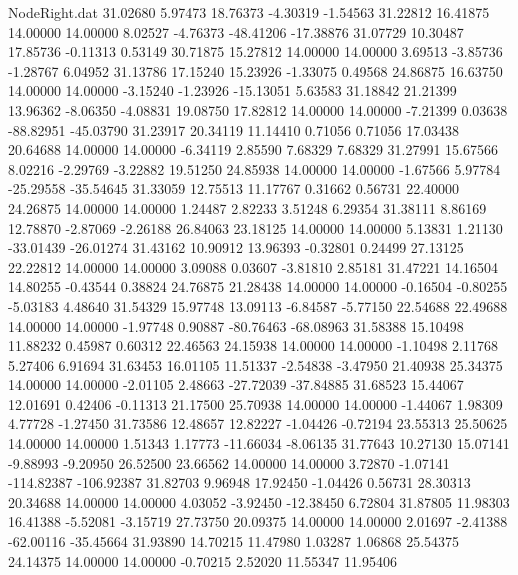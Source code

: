 \begin{filecontents}{NodeRight.dat}
  31.02680    5.97473   18.76373    -4.30319   -1.54563   31.22812   16.41875   14.00000   14.00000    8.02527   -4.76373  -48.41206  -17.38876
  31.07729   10.30487   17.85736    -0.11313    0.53149   30.71875   15.27812   14.00000   14.00000    3.69513   -3.85736   -1.28767    6.04952
  31.13786   17.15240   15.23926    -1.33075    0.49568   24.86875   16.63750   14.00000   14.00000   -3.15240   -1.23926  -15.13051    5.63583
  31.18842   21.21399   13.96362    -8.06350   -4.08831   19.08750   17.82812   14.00000   14.00000   -7.21399    0.03638  -88.82951  -45.03790
  31.23917   20.34119   11.14410     0.71056    0.71056   17.03438   20.64688   14.00000   14.00000   -6.34119    2.85590    7.68329    7.68329
  31.27991   15.67566    8.02216    -2.29769   -3.22882   19.51250   24.85938   14.00000   14.00000   -1.67566    5.97784  -25.29558  -35.54645
  31.33059   12.75513   11.17767     0.31662    0.56731   22.40000   24.26875   14.00000   14.00000    1.24487    2.82233    3.51248    6.29354
  31.38111    8.86169   12.78870    -2.87069   -2.26188   26.84063   23.18125   14.00000   14.00000    5.13831    1.21130  -33.01439  -26.01274
  31.43162   10.90912   13.96393    -0.32801    0.24499   27.13125   22.22812   14.00000   14.00000    3.09088    0.03607   -3.81810    2.85181
  31.47221   14.16504   14.80255    -0.43544    0.38824   24.76875   21.28438   14.00000   14.00000   -0.16504   -0.80255   -5.03183    4.48640
  31.54329   15.97748   13.09113    -6.84587   -5.77150   22.54688   22.49688   14.00000   14.00000   -1.97748    0.90887  -80.76463  -68.08963
  31.58388   15.10498   11.88232     0.45987    0.60312   22.46563   24.15938   14.00000   14.00000   -1.10498    2.11768    5.27406    6.91694
  31.63453   16.01105   11.51337    -2.54838   -3.47950   21.40938   25.34375   14.00000   14.00000   -2.01105    2.48663  -27.72039  -37.84885
  31.68523   15.44067   12.01691     0.42406   -0.11313   21.17500   25.70938   14.00000   14.00000   -1.44067    1.98309    4.77728   -1.27450
  31.73586   12.48657   12.82227    -1.04426   -0.72194   23.55313   25.50625   14.00000   14.00000    1.51343    1.17773  -11.66034   -8.06135
  31.77643   10.27130   15.07141    -9.88993   -9.20950   26.52500   23.66562   14.00000   14.00000    3.72870   -1.07141 -114.82387 -106.92387
  31.82703    9.96948   17.92450    -1.04426    0.56731   28.30313   20.34688   14.00000   14.00000    4.03052   -3.92450  -12.38450    6.72804
  31.87805   11.98303   16.41388    -5.52081   -3.15719   27.73750   20.09375   14.00000   14.00000    2.01697   -2.41388  -62.00116  -35.45664
  31.93890   14.70215   11.47980     1.03287    1.06868   25.54375   24.14375   14.00000   14.00000   -0.70215    2.52020   11.55347   11.95406

\end{filecontents}

